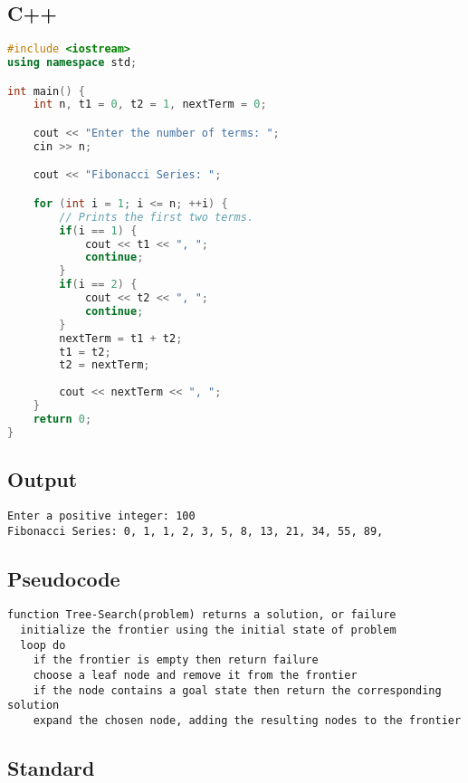 \documentclass[10pt]{article}
\begin{document}
\subsection{C++}

\begin{lstlisting}[caption=Example in C++,language=c++]
#include <iostream>
using namespace std;

int main() {
    int n, t1 = 0, t2 = 1, nextTerm = 0;

    cout << "Enter the number of terms: ";
    cin >> n;

    cout << "Fibonacci Series: ";

    for (int i = 1; i <= n; ++i) {
        // Prints the first two terms.
        if(i == 1) {
            cout << t1 << ", ";
            continue;
        }
        if(i == 2) {
            cout << t2 << ", ";
            continue;
        }
        nextTerm = t1 + t2;
        t1 = t2;
        t2 = nextTerm;
        
        cout << nextTerm << ", ";
    }
    return 0;
}
\end{lstlisting}

\subsection{Output}

\begin{lstlisting}[style=lstoutput]
Enter a positive integer: 100
Fibonacci Series: 0, 1, 1, 2, 3, 5, 8, 13, 21, 34, 55, 89, 
\end{lstlisting}

\subsection{Pseudocode}

\begin{lstlisting}[caption=Example in Pseudo,language=pseudo]
function Tree-Search(problem) returns a solution, or failure
  initialize the frontier using the initial state of problem
  loop do
    if the frontier is empty then return failure
    choose a leaf node and remove it from the frontier
    if the node contains a goal state then return the corresponding solution
    expand the chosen node, adding the resulting nodes to the frontier
\end{lstlisting}

\subsection{Standard}
\end{document}
